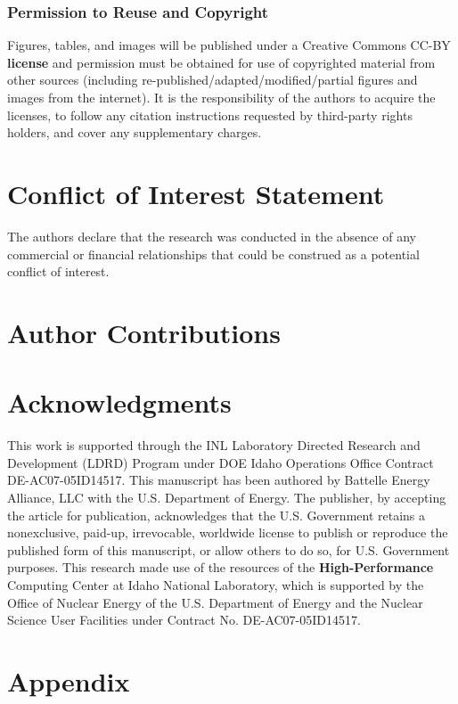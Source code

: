 \documentclass[utf8]{frontiersSCNS} %
\providecommand{\DIFaddtex}[1]{{\bf #1}} %
\providecommand{\DIFdeltex}[1]{} %
\providecommand{\DIFaddbegin}{\protect\color{blue}} %
\providecommand{\DIFaddend}{\protect\color{black}} %
\providecommand{\DIFdelbegin}{\protect\color{red}} %
\providecommand{\DIFdelend}{\protect\color{black}} %
\providecommand{\DIFadd}[1]{\texorpdfstring{\DIFaddtex{#1}}{#1}} %
\providecommand{\DIFdel}[1]{\texorpdfstring{\DIFdeltex{#1}}{}} %
\begin{document}
\subsubsection{Permission to Reuse and Copyright}
Figures, tables, and images will be published under a Creative Commons CC-BY \DIFdelbegin \DIFdel{licence }\DIFdelend \DIFaddbegin \DIFadd{license }\DIFaddend and permission must be obtained for use of copyrighted material from other sources (including re-published/adapted/modified/partial figures and images from the internet). It is the responsibility of the authors to acquire the licenses, to follow any citation instructions requested by third-party rights holders, and cover any supplementary charges.

\section*{Conflict of Interest Statement}

The authors declare that the research was conducted in the absence of any commercial or financial relationships that could be construed as a potential conflict of interest.

\section*{Author Contributions}


\section*{Acknowledgments}
This work is supported through the INL Laboratory Directed Research and Development (LDRD) Program under DOE Idaho Operations Office Contract DE-AC07-05ID14517. This manuscript has been authored by Battelle Energy Alliance, LLC with the U.S. Department of Energy. The publisher, by accepting the article for publication, acknowledges that the U.S. Government retains a nonexclusive, paid-up, irrevocable, worldwide license to publish or reproduce the published form of this manuscript, or allow others to do so, for U.S. Government purposes. This research made use of the resources of the \DIFdelbegin \DIFdel{High Performance }\DIFdelend \DIFaddbegin \DIFadd{High-Performance }\DIFaddend Computing Center at Idaho National Laboratory, which is supported by the Office of Nuclear Energy of the U.S. Department of Energy and the Nuclear Science User Facilities under Contract No. DE-AC07-05ID14517. 
\DIFaddbegin 

\section{\DIFadd{Appendix}}
\end{document}
